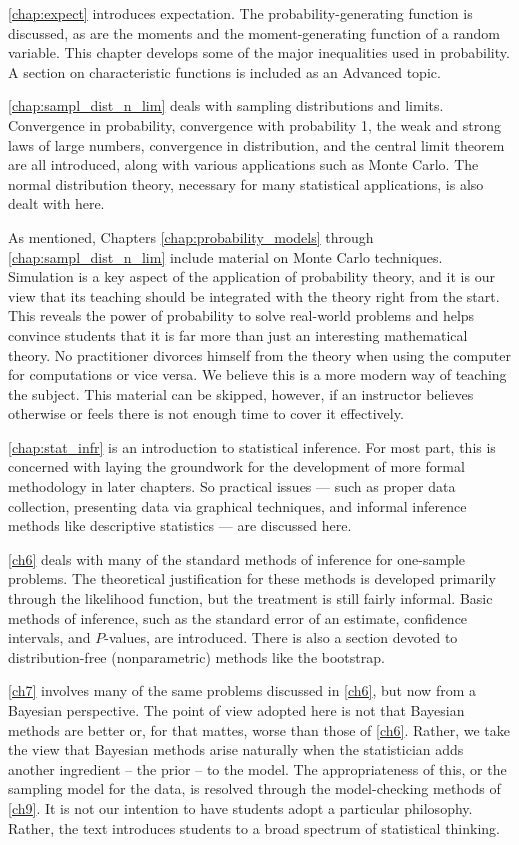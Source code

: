 \autoref{chap:expect} introduces expectation. The probability-generating function is discussed, as are the moments and the moment-generating function of a random variable. This chapter develops some of the major inequalities used in probability. A section on characteristic functions is included as an Advanced topic.

\autoref{chap:sampl_dist_n_lim} deals with sampling distributions and limits. Convergence in probability, convergence with probability 1, the weak and strong laws of large numbers, convergence in distribution, and the central limit theorem are all introduced, along with various applications such as Monte Carlo. The normal distribution theory, necessary  for  many statistical applications, is also dealt with here.

As mentioned, Chapters \ref{chap:probability_models} through \ref{chap:sampl_dist_n_lim} include material on Monte Carlo techniques. Simulation is a key aspect of the application of probability theory, and it is our view that its teaching should be integrated with the theory right from the start. This reveals the power of probability to solve real-world problems and helps convince students that it is far more than just an interesting mathematical theory. No practitioner divorces himself from the theory when using the computer for computations or vice versa. We believe this is a more modern way of teaching the subject. This material can be skipped, however, if an instructor believes otherwise or feels there is not enough time to cover it effectively.

\autoref{chap:stat_infr} is an introduction to statistical inference. For most part, this is concerned with laying the groundwork for the development of more formal methodology in later chapters. So practical issues --- such as proper data collection, presenting data via graphical techniques, and informal inference methods like descriptive statistics --- are discussed here.

\autoref{ch6} deals with many of the standard methods of inference for one-sample problems. The theoretical justification for these methods is developed primarily through the likelihood function, but the treatment is still fairly informal. Basic methods of inference, such as the standard error of an estimate, confidence intervals, and $P$-values, are introduced. There is also a section devoted to distribution-free (nonparametric) methods like the bootstrap.

\autoref{ch7} involves many of the same problems discussed in \autoref{ch6}, but now from a Bayesian perspective. The point of view adopted here is not that Bayesian methods are better or, for that mattes, worse than those of \autoref{ch6}. Rather, we take the view that Bayesian methods arise naturally when the statistician adds another ingredient -- the prior -- to the model. The appropriateness of this,  or the sampling model for the data, is resolved through the model-checking methods of \autoref{ch9}. It is not our intention to have students adopt a particular philosophy. Rather, the text introduces students to a broad spectrum of statistical thinking.

